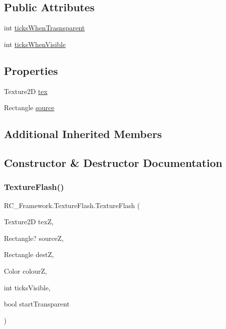 \subsection*{Public Attributes}
\begin{DoxyCompactItemize}
\item 
int \mbox{\hyperlink{class_r_c___framework_1_1_texture_flash_a97c2fc82f60a04f2a362a1b5c938500f}{ticks\+When\+Trasnsparent}}
\item 
int \mbox{\hyperlink{class_r_c___framework_1_1_texture_flash_af69dc7a9faf8d9eff864fd375463b531}{ticks\+When\+Visible}}
\end{DoxyCompactItemize}
\subsection*{Properties}
\begin{DoxyCompactItemize}
\item 
Texture2D \mbox{\hyperlink{class_r_c___framework_1_1_texture_flash_aa4a39d60358fc6f1d71c97171172d5ff}{tex}}
\item 
Rectangle \mbox{\hyperlink{class_r_c___framework_1_1_texture_flash_af347ee8c3b486b2db59798831f3aab31}{source}}
\end{DoxyCompactItemize}
\subsection*{Additional Inherited Members}


\subsection{Constructor \& Destructor Documentation}
\mbox{\label{class_r_c___framework_1_1_texture_flash_a6a8cf95a19bdc9e0c6a2d6d4bed8cebc}} 
\subsubsection{\texorpdfstring{Texture\+Flash()}{TextureFlash()}\hspace{0.1cm}{\footnotesize\ttfamily [1/2]}}
{\footnotesize\ttfamily R\+C\+\_\+\+Framework.\+Texture\+Flash.\+Texture\+Flash (\begin{DoxyParamCaption}\item[{Texture2D}]{texZ,  }\item[{Rectangle?}]{sourceZ,  }\item[{Rectangle}]{destZ,  }\item[{Color}]{colourZ,  }\item[{int}]{ticks\+Visible,  }\item[{bool}]{start\+Transparent }\end{DoxyParamCaption})}

